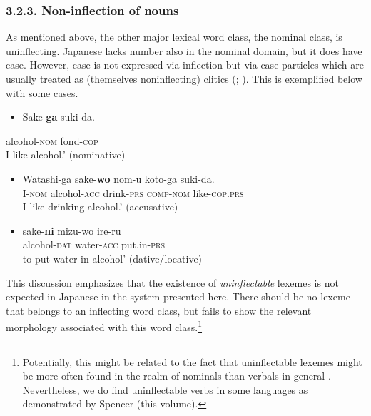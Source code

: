 \documentclass[output=paper]{langscibook}
\begin{document}
\subsubsection{3.2.3. Non-inflection of nouns}

As mentioned above, the other major lexical word class, the nominal class, is uninflecting. Japanese lacks number also in the nominal domain, but it does have case. However, case is not expressed via inflection but via case particles which are usually treated as (themselves noninflecting) clitics (\citealt{Uehara1998}; \citealt{Iwasaki2013}). This is exemplified below with some cases.

\begin{itemize}
\item \begin{styleBeispielCinqueKapitel}
Sake-\textbf{ga} suki-da.
\end{styleBeispielCinqueKapitel}
\end{itemize}
\begin{styleBeispielCinqueKapitel}
alcohol-\textsc{nom} fond-\textsc{cop}\\
{\textasciigrave}I like alcohol.’       (nominative)
\end{styleBeispielCinqueKapitel}

\begin{itemize}
\item \begin{styleBeispielCinqueKapitel}
Watashi-ga sake-\textbf{wo} nom-u koto-ga suki-da.\\
I-\textsc{nom} alcohol-\textsc{acc} drink-\textsc{prs} \textsc{comp-nom} like-\textsc{cop.prs}\\
{\textasciigrave}I like drinking alcohol.’     (accusative)
\end{styleBeispielCinqueKapitel}
\item \begin{styleBeispielCinqueKapitel}
sake-\textbf{ni} mizu-wo ire-ru\\
alcohol-\textsc{dat} water-\textsc{acc} put.in-\textsc{prs}\\
{\textasciigrave}to put water in alcohol’     (dative/locative)
\end{styleBeispielCinqueKapitel}
\end{itemize}

This discussion emphasizes that the existence of \textit{uninflectable} lexemes is not expected in Japanese in the system presented here. There should be no lexeme that belongs to an inflecting word class, but fails to show the relevant morphology associated with this word class.\footnote{Potentially, this might be related to the fact that uninflectable lexemes might be more often found in the realm of nominals than verbals in general \citep[143]{Spencer2020}. Nevertheless, we do find uninflectable verbs in some languages as demonstrated by Spencer (this volume).}
\end{document}
